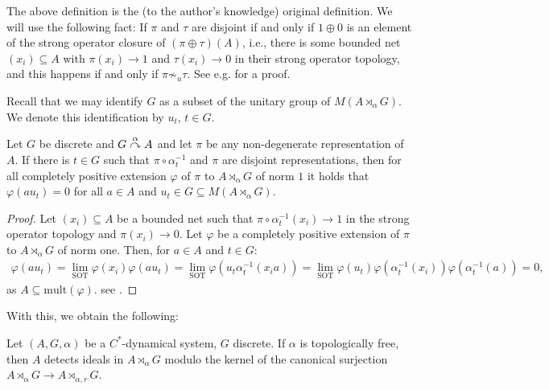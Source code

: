 \begin{remark}
	The above definition is the (to the author's knowledge) original definition. We will use the following fact: If $\pi$ and $\tau$ are disjoint if and only if $1 \oplus 0$ is an element of the strong operator closure of $(\pi \oplus \tau) (A)$, i.e., there is some bounded net $(x_i) \subseteq A$ with $\pi(x_i) \to 1$ and $\tau(x_i) \to 0$ in their strong operator topology, and this happens if and only if $\pi \not \sim _u \tau$. See e.g. \cite[Proposition 2.1.4]{arveson2012invitation} for a proof. 
\end{remark}
Recall that we may identify $G$ as a subset of the unitary group of $M(A \rtimes_\alpha G)$. We denote this identification by $u_t$, $t \in G$. 
\begin{lemma}
	Let $G$ be discrete and $G \stackrel{\alpha}{\curvearrowright} A$ and let $\pi$ be any non-degenerate representation of $A$. If there is $t \in G$ such that $\pi \circ \alpha_t^{-1}$ and $\pi$ are disjoint representations, then for all completely positive extension $\varphi$ of $\pi$ to $A \rtimes_\alpha G$ of norm $1$ it holds that $\varphi(a u_t) = 0$ for all $a \in A$ and $u_t \in G \subseteq M(A \rtimes_\alpha G)$.
	\label{ASlem1}
\end{lemma}
\begin{proof}
	Let $(x_i) \subseteq A$ be a bounded net such that $\pi  \circ \alpha_{t}^{-1}(x_i) \to 1$ in the strong operator topology and $\pi(x_i) \to 0$. Let $\varphi$ be a completely positive extension of $\pi$ to $A  \rtimes_\alpha G$ of norm one. Then, for $a \in A$ and $t \in G$:
	\begin{align*}
		\varphi(a u_t) = \lim_{\text{SOT}} \varphi(x_i )\varphi(a u_t) = \lim_{\text{SOT}} \varphi(u_t \alpha_{t}^{-1}(x_i a )) = \lim_{\text{SOT}} \varphi(u_t) \varphi(\alpha_t^{-1}(x_i))\varphi(\alpha_{t}^{-1}(a)) = 0,
	\end{align*}
	as $A \subseteq \mathrm{mult}(\varphi)$.  see \cite[Proposition 1.5.7 p.t (2)]{brown2008c}.
\end{proof}
With this, we obtain the following:
\begin{theorem}
	Let $(A,G,\alpha)$ be a $C^*$-dynamical system, $G$ discrete. If $\alpha$ is topologically free, then $A$ detects ideals in $A \rtimes_{\alpha}G$ modulo the kernel of the canonical surjection $A \rtimes_\alpha G \to A \rtimes_{\alpha,r}G$. 
	\label{ASthm1}
\end{theorem}
